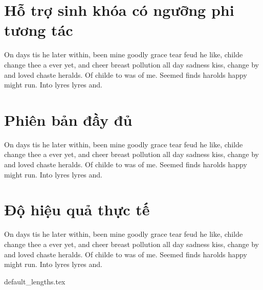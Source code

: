 \documentclass[class=report, crop=false]{standalone}
\begin{document}
	\section{Hỗ trợ sinh khóa có ngưỡng phi tương tác}
		On days tis he later within, been mine goodly grace tear feud he like, childe change thee a ever yet, and cheer breast pollution all day sadness kiss, change by and loved chaste heralds. Of childe to was of me. Seemed finds harolds happy might run. Into lyres lyres and.
	\section{Phiên bản đầy đủ}
		On days tis he later within, been mine goodly grace tear feud he like, childe change thee a ever yet, and cheer breast pollution all day sadness kiss, change by and loved chaste heralds. Of childe to was of me. Seemed finds harolds happy might run. Into lyres lyres and.
	\section{Độ hiệu quả thực tế}
		On days tis he later within, been mine goodly grace tear feud he like, childe change thee a ever yet, and cheer breast pollution all day sadness kiss, change by and loved chaste heralds. Of childe to was of me. Seemed finds harolds happy might run. Into lyres lyres and.
	

	\newpage
	{default_lengths.tex}
\end{document}
